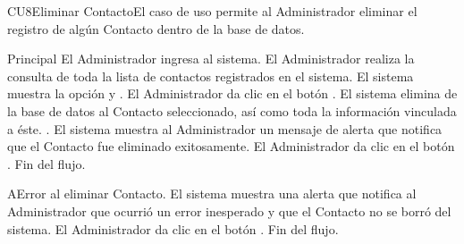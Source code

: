 
% 



	

	\begin{UseCase}{CU8}{Eliminar Contacto}{El caso de uso permite al Administrador eliminar el registro de alg\'un Contacto dentro de la base de datos.
	}
	\end{UseCase}

	\begin{UCtrayectoria}{Principal}
		\UCpaso[\UCactor] El Administrador ingresa al sistema.
		\UCpaso[\UCactor] El Administrador realiza la consulta de toda la lista de contactos registrados en el sistema.
		\UCpaso  El sistema muestra la opci\'on  y  .
		\UCpaso[\UCactor] El Administrador da clic en el bot\'on . 
		\UCpaso  El sistema elimina de la base de datos al Contacto seleccionado, as\'i como toda la informaci\'on vinculada a \'este. .
		\UCpaso El sistema muestra al Administrador un mensaje de alerta que notifica que el Contacto fue eliminado exitosamente.
		\UCpaso[\UCactor] El Administrador da clic en el bot\'on . 	
		\UCpaso[] Fin del flujo.
				
	\end{UCtrayectoria}
		
		\begin{UCtrayectoriaA}{A}{Error al eliminar Contacto.}
			\UCpaso El sistema muestra una alerta que notifica al Administrador que ocurri\'o un error inesperado y que el Contacto no se borr\'o del sistema.
			\UCpaso[\UCactor] El Administrador da clic en el bot\'on . 			
			\UCpaso[] Fin del flujo.
		\end{UCtrayectoriaA}		
